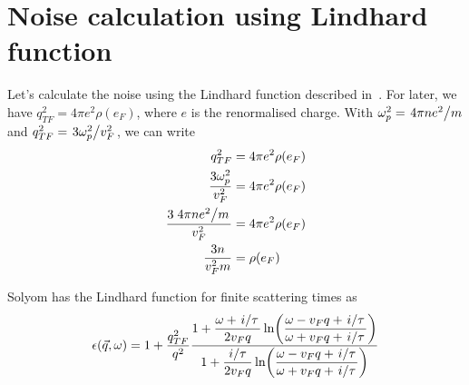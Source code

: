 \documentclass[11pt]{article}
\begin{document}
	\graphicspath{{figures/}}

	\section{Noise calculation using Lindhard function} \label{sec:intro}

	Let's calculate the noise using the Lindhard function described in~\cite{SolyomV3}.
	For later, we have $q_{TF}^2 = 4 \pi e^2 \rho(e_F)$, where $e$ is the renormalised charge.
	With $\omega_p^2 = \flatfrac{4 \pi n e^2}{m}$ and $q_{TF}^2 = \flatfrac{3 \omega_p^2}{v_F^2}$, we can write
	\begin{align}
		q_{TF}^2 &= 4 \pi e^2 \rho(e_F) \\
		\frac{3 \omega_p^2}{v_F^2} &= 4 \pi e^2 \rho(e_F) \\
		\frac{3 \flatfrac{4 \pi n e^2}{m}}{v_F^2} &= 4 \pi e^2 \rho(e_F) \\
		\frac{3n}{v_F^2 m} &= \rho(e_F) \\
	\end{align}

	Solyom has the Lindhard function for finite scattering times as
	\begin{equation}
		\epsilon(\vec{q}, \omega) = 1 + \frac{q_{TF}^2}{q^2}\frac{\displaystyle 1 + \frac{\omega + \flatfrac{i}{\tau}}{2 v_F q} \ln(\frac{\omega - v_F q + \flatfrac{i}{\tau}}{\omega + v_F q + \flatfrac{i}{\tau}})}{\displaystyle 1 + \frac{\flatfrac{i}{\tau}}{2 v_F q} \ln(\frac{\omega - v_F q + \flatfrac{i}{\tau}}{\omega + v_F q + \flatfrac{i}{\tau}})}
	\end{equation}

	\newpage
	\listoftodos
	\newpage
	\printbibliography
\end{document}
